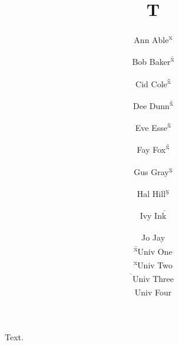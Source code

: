 \documentclass{article}
\title{T}
\author{Ann Able\textsuperscript{x} \and Bob Baker\textsuperscript{\={x}} \and Cid Cole\textsuperscript{\~{x}}
  \and Dee Dunn\textsuperscript{\v{x}} \and Eve Esse\textsuperscript{\u{x}} \and Fay Fox\textsuperscript{\H{x}}
  \and Gus Gray\textsuperscript{\b{x}} \and Hal Hill\textsuperscript{\d{x}} \and Ivy Ink\textsuperscript{\={\dag}}
  \and Jo Jay\textsuperscript{\dag}\\
  \textsuperscript{\={x}}Univ One \\ \textsuperscript{x}Univ Two \\ \textsuperscript{\={\dag}}Univ Three \\
  \textsuperscript{\dag}Univ Four}
\begin{document}
\maketitle
Text.
\end{document}
